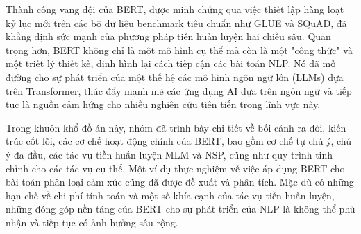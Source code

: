 Thành công vang dội của BERT, được minh chứng qua việc thiết lập hàng loạt kỷ lục mới trên các bộ dữ liệu benchmark tiêu chuẩn như GLUE và SQuAD, đã khẳng định sức mạnh của phương pháp tiền huấn luyện hai chiều sâu. Quan trọng hơn, BERT không chỉ là một mô hình cụ thể mà còn là một "công thức" và một triết lý thiết kế, định hình lại cách tiếp cận các bài toán NLP. Nó đã mở đường cho sự phát triển của một thế hệ các mô hình ngôn ngữ lớn (LLMs) dựa trên Transformer, thúc đẩy mạnh mẽ các ứng dụng AI dựa trên ngôn ngữ và tiếp tục là nguồn cảm hứng cho nhiều nghiên cứu tiên tiến trong lĩnh vực này.

Trong khuôn khổ đồ án này, nhóm đã trình bày chi tiết về bối cảnh ra đời, kiến trúc cốt lõi, các cơ chế hoạt động chính của BERT, bao gồm cơ chế tự chú ý, chú ý đa đầu, các tác vụ tiền huấn luyện MLM và NSP, cũng như quy trình tinh chỉnh cho các tác vụ cụ thể. Một ví dụ thực nghiệm về việc áp dụng BERT cho bài toán phân loại cảm xúc cũng đã được đề xuất và phân tích. Mặc dù có những hạn chế về chi phí tính toán và một số khía cạnh của tác vụ tiền huấn luyện, những đóng góp nền tảng của BERT cho sự phát triển của NLP là không thể phủ nhận và tiếp tục có ảnh hưởng sâu rộng.
